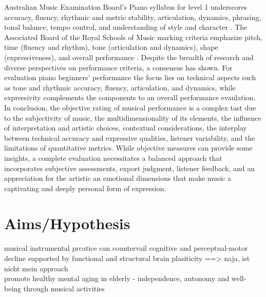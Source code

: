 Australian Music Examination Board's Piano syllabus for level 1 underscores accuracy, fluency, rhythmic and metric stability, articulation, dynamics, phrasing, tonal balance, tempo control, and understanding of style and character \cite{AMEB}. The Associated Board of the Royal Schools of Music marking criteria emphasize pitch, time (fluency and rhythm), tone (articulation and dynamics), shape (expressiveness), and overall performance \cite{ABRSM}. Despite the breadth of research and diverse perspectives on performance criteria, a consensus has shown. For evaluation piano beginners' performance the focus lies on technical aspects such as tone and rhythmic accuracy, fluency, articulation, and dynamics, while expressivity complements the components to an overall performance evaulation. \\
In conclusion, the objective rating of musical performance is a complex tast due to the subjectivity of music, the multidimensionality of its elements, the influence of interpretation and artistic choices, contextual considerations, the interplay between technical accuracy and expressive qualities, listener variability, and the limitations of quantitative metrics. While objective measures can provide some insights, a complete evaluation necessitates a balanced approach that incorporates subjective assessments, export judgment, listener feedback, and an appreciation for the artistic an emotional dimensions that make music a captivating and deeply personal form of expression.




\section{Aims/Hypothesis}
musical instrumental prcatice can countervail cognitive and perceptual-motor decline supported by functional and structural brain plasiticity ==> naja, ist nicht mein approach
\\promote healthy mental aging in elderly - independence, autonomy and well-being through musical activities